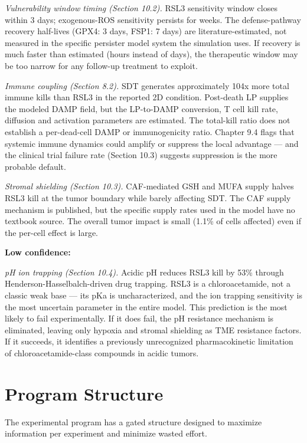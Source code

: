 \documentclass[11pt,twoside,openright]{report}
\begin{document}
\textit{Vulnerability window timing (Section 10.2).} RSL3 sensitivity window closes within 3 days; exogenous-ROS sensitivity persists for weeks. The defense-pathway recovery half-lives (GPX4: 3 days, FSP1: 7 days) are literature-estimated, not measured in the specific persister model system the simulation uses. If recovery is much faster than estimated (hours instead of days), the therapeutic window may be too narrow for any follow-up treatment to exploit.

\textit{Immune coupling (Section 8.2).} SDT generates approximately 104x more total immune kills than RSL3 in the reported 2D condition. Post-death LP supplies the modeled DAMP field, but the LP-to-DAMP conversion, T cell kill rate, diffusion and activation parameters are estimated. The total-kill ratio does not establish a per-dead-cell DAMP or immunogenicity ratio. Chapter 9.4 flags that systemic immune dynamics could amplify or suppress the local advantage --- and the clinical trial failure rate (Section 10.3) suggests suppression is the more probable default.

\textit{Stromal shielding (Section 10.3).} CAF-mediated GSH and MUFA supply halves RSL3 kill at the tumor boundary while barely affecting SDT. The CAF supply mechanism is published, but the specific supply rates used in the model have no textbook source. The overall tumor impact is small (1.1\% of cells affected) even if the per-cell effect is large.

\textbf{Low confidence:}

\textit{pH ion trapping (Section 10.4).} Acidic pH reduces RSL3 kill by 53\% through Henderson-Hasselbalch-driven drug trapping. RSL3 is a chloroacetamide, not a classic weak base --- its pKa is uncharacterized, and the ion trapping sensitivity is the most uncertain parameter in the entire model. This prediction is the most likely to fail experimentally. If it does fail, the pH resistance mechanism is eliminated, leaving only hypoxia and stromal shielding as TME resistance factors. If it succeeds, it identifies a previously unrecognized pharmacokinetic limitation of chloroacetamide-class compounds in acidic tumors.

\section{Program Structure}

The experimental program has a gated structure designed to maximize information per experiment and minimize wasted effort.
\end{document}
